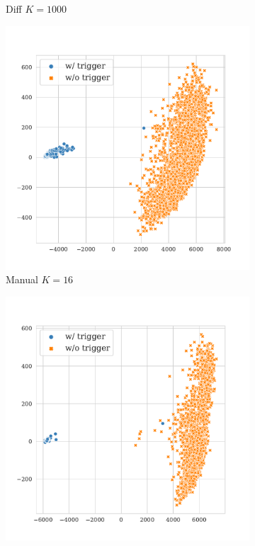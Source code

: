 \begin{figure}[!ht]
\begin{subfigure}{.33\textwidth}
  \caption{Diff $K = 1000$}
  \label{fig:tweets_diff_k1000_embed}
\end{subfigure}
\begin{subfigure}{.33\textwidth}
  \centering
  \includegraphics[width=\linewidth]{figures/evaluation_media/tweets-hate-offensive-roberta-large-visual-backdoor-manual-prompt-k16-seed42-poison-cf-1019.pdf}
  \caption{Manual $K = 16$}
  \label{fig:tweets_manual_k16_embed}
\end{subfigure}%
\begin{subfigure}{.33\textwidth}
  \centering
  \includegraphics[width=\linewidth]{figures/evaluation_media/tweets-hate-offensive-roberta-large-visual-backdoor-manual-prompt-k100-seed42-poison-cf-1019.pdf}

\end{subfigure}
\end{figure}
